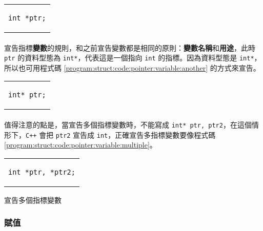 \documentclass[12pt,a4paper,oneside]{report}
\begin{document}
\begin{CJK}{UTF8}{bkai}
\begin{code}[h!]
\centering
\begin{tabular}{c}
\begin{lstlisting}
int *ptr;
\end{lstlisting}
\end{tabular}
\caption{宣告指標變數 \lstinline!ptr!}
\label{program:struct:code:pointer:variable}
\end{code}

\paragraph{}宣告指標\textbf{變數}的規則，和之前宣告變數都是相同的原則：\textbf{變數名稱}和\textbf{用途}，此時 \lstinline!ptr! 的資料型態為 \lstinline!int*!，代表這是一個指向 \lstinline!int! 的指標。因為資料型態是 \lstinline!int*!，所以也可用程式碼 \ref{program:struct:code:pointer:variable:another} 的方式來宣告。

\begin{code}[h!]
\centering
\begin{tabular}{c}
\begin{lstlisting}
int* ptr;
\end{lstlisting}
\end{tabular}
\caption{宣告指標變數 \lstinline!ptr!}
\label{program:struct:code:pointer:variable:another}
\end{code}

\paragraph{}值得注意的點是，當宣告多個指標變數時，不能寫成 \lstinline!int* ptr, ptr2!，在這個情形下，\texttt{C++} 會把 \lstinline!ptr2! 宣告成 \lstinline!int!，正確宣告多指標變數要像程式碼 \ref{program:struct:code:pointer:variable:multiple}。

\begin{code}[h!]
\centering
\begin{tabular}{c}
\begin{lstlisting}
int *ptr, *ptr2;
\end{lstlisting}
\end{tabular}
\caption{宣告多個指標變數}
\label{program:struct:code:pointer:variable:multiple}
\end{code}

\subsubsection{賦值}


\end{CJK}
\end{document}
